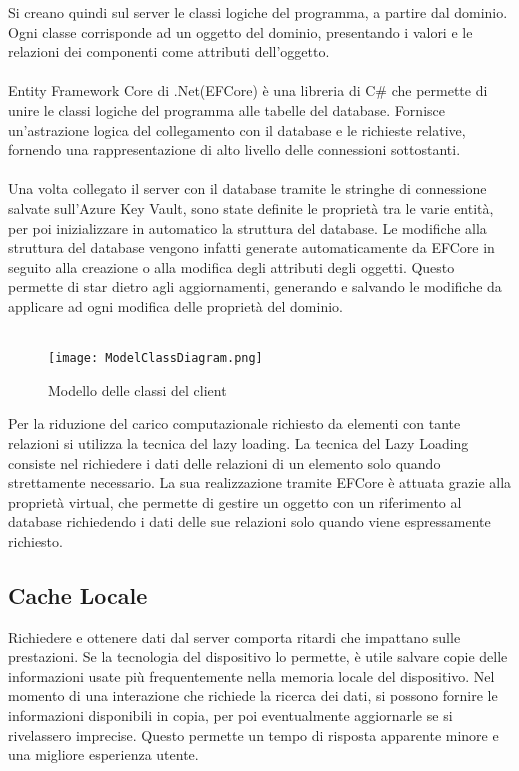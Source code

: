 Si creano quindi sul server le classi logiche del programma, a partire dal dominio. 
Ogni classe corrisponde ad un oggetto del dominio, presentando i valori e le relazioni dei componenti come attributi dell’oggetto.\\
\\
Entity Framework Core di .Net(EFCore) è una libreria di C\# che permette di unire le classi logiche del programma alle tabelle del database. 
Fornisce un’astrazione logica del collegamento con il database e le richieste relative, fornendo una rappresentazione di alto livello delle connessioni sottostanti. \\
\\
Una volta collegato il server con il database tramite le stringhe di connessione salvate sull’Azure Key Vault, 
sono state definite le proprietà tra le varie entità, per poi inizializzare in automatico la struttura del database. 
Le modifiche alla struttura del database vengono infatti generate automaticamente da EFCore in seguito alla creazione o alla modifica degli attributi degli oggetti. 
Questo permette di star dietro agli aggiornamenti, generando e salvando le modifiche da applicare ad ogni modifica delle proprietà del dominio.\\
\\
\begin{figure}[h!]
    \begin{center}
        \texttt{[image: ModelClassDiagram.png]}
        \caption{Modello delle classi del client}
    \end{center}
\end{figure}

Per la riduzione del carico computazionale richiesto da elementi con tante relazioni si utilizza la tecnica del lazy loading. 
La tecnica del Lazy Loading consiste nel richiedere i dati delle relazioni di un elemento solo quando strettamente necessario. 
La sua realizzazione tramite EFCore è attuata grazie alla proprietà virtual, 
che permette di gestire un oggetto con un riferimento al database richiedendo i dati delle sue relazioni solo quando viene espressamente richiesto.
\clearpage
\subsection{Cache Locale}

Richiedere e ottenere dati dal server comporta ritardi che impattano sulle prestazioni. 
Se la tecnologia del dispositivo lo permette, è utile salvare copie delle informazioni usate più frequentemente nella memoria locale del dispositivo. 
Nel momento di una interazione che richiede la ricerca dei dati, si possono fornire le informazioni disponibili in copia, 
per poi eventualmente aggiornarle se si rivelassero imprecise. Questo permette un tempo di risposta apparente minore e una migliore esperienza utente.\\
\\
